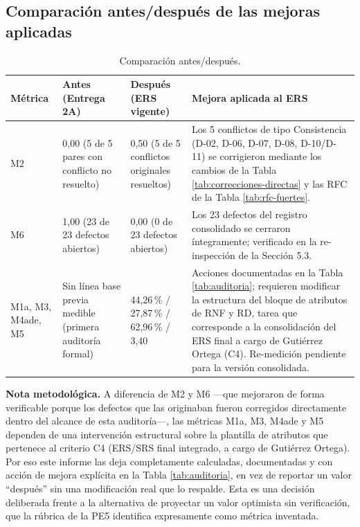\documentclass[journal,onecolumn]{IEEEtran}
\begin{document}
\subsection{Comparación antes/después de las mejoras aplicadas}

\begin{table}[H]
	\centering
	\caption{Comparación antes/después.}
	\label{tab:antes-despues}
	\small
	\begin{tabularx}{\textwidth}{|L{2cm}|L{3.2cm}|L{3.2cm}|X|}
		\hline
		\textbf{Métrica} & \textbf{Antes (Entrega 2A)} & \textbf{Después (ERS vigente)} & \textbf{Mejora aplicada al ERS} \\
		\hline
		M2 & 0,00 (5 de 5 pares con conflicto no resuelto) & 0,50 (5 de 5 conflictos originales resueltos) & Los 5 conflictos de tipo Consistencia (D-02, D-06, D-07, D-08, D-10/D-11) se corrigieron mediante los cambios de la Tabla \ref{tab:correcciones-directas} y las RFC de la Tabla \ref{tab:rfc-fuertes}. \\
		\hline
		M6 & 1,00 (23 de 23 defectos abiertos) & 0,00 (0 de 23 defectos abiertos) & Los 23 defectos del registro consolidado se cerraron íntegramente; verificado en la re-inspección de la Sección 5.3. \\
		\hline
		M1a, M3, M4ade, M5 & Sin línea base previa medible (primera auditoría formal) & 44,26\,\% / 27,87\,\% / 62,96\,\% / 3,40 & Acciones documentadas en la Tabla \ref{tab:auditoria}; requieren modificar la estructura del bloque de atributos de RNF y RD, tarea que corresponde a la consolidación del ERS final a cargo de Gutiérrez Ortega (C4). Re-medición pendiente para la versión consolidada. \\
		\hline
	\end{tabularx}
\end{table}

\textbf{Nota metodológica.} A diferencia de M2 y M6 ---que mejoraron de forma verificable porque los defectos que las originaban fueron corregidos directamente dentro del alcance de esta auditoría---, las métricas M1a, M3, M4ade y M5 dependen de una intervención estructural sobre la plantilla de atributos que pertenece al criterio C4 (ERS/SRS final integrado, a cargo de Gutiérrez Ortega). Por eso este informe las deja completamente calculadas, documentadas y con acción de mejora explícita en la Tabla \ref{tab:auditoria}, en vez de reportar un valor ``después'' sin una modificación real que lo respalde. Esta es una decisión deliberada frente a la alternativa de proyectar un valor optimista sin verificación, que la rúbrica de la PE5 identifica expresamente como métrica inventada.
	\newpage
	
\end{document}
